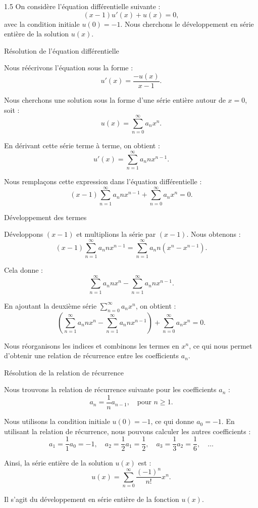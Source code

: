 \documentclass[12pt]{article}
\begin{document}
\begin{spacing}{1.5}
On considère l'équation différentielle suivante :
\[
(x - 1) u'(x) + u(x) = 0,
\]
avec la condition initiale \( u(0) = -1 \). Nous cherchons le développement en série entière de la solution \( u(x) \).

\quad
 Résolution de l'équation différentielle

Nous réécrivons l'équation sous la forme :
\[
u'(x) = \frac{-u(x)}{x - 1}.
\]

Nous cherchons une solution sous la forme d'une série entière autour de \( x = 0 \), soit :
\[
u(x) = \sum_{n=0}^{\infty} a_n x^n.
\]

En dérivant cette série terme à terme, on obtient :
\[
u'(x) = \sum_{n=1}^{\infty} a_n n x^{n-1}.
\]

Nous remplaçons cette expression dans l'équation différentielle :
\[
(x - 1) \sum_{n=1}^{\infty} a_n n x^{n-1} + \sum_{n=0}^{\infty} a_n x^n = 0.
\]

\quad
 Développement des termes

Développons \( (x - 1) \) et multiplions la série par \( (x - 1) \). Nous obtenons :
\[
(x - 1) \sum_{n=1}^{\infty} a_n n x^{n-1} = \sum_{n=1}^{\infty} a_n n (x^{n} - x^{n-1}).
\]

Cela donne :
\[
\sum_{n=1}^{\infty} a_n n x^n - \sum_{n=1}^{\infty} a_n n x^{n-1}.
\]

En ajoutant la deuxième série \( \sum_{n=0}^{\infty} a_n x^n \), on obtient :
\[
\left( \sum_{n=1}^{\infty} a_n n x^n - \sum_{n=1}^{\infty} a_n n x^{n-1} \right) + \sum_{n=0}^{\infty} a_n x^n = 0.
\]

Nous réorganisons les indices et combinons les termes en \( x^n \), ce qui nous permet d'obtenir une relation de récurrence entre les coefficients \( a_n \).

\quad
 Résolution de la relation de récurrence

Nous trouvons la relation de récurrence suivante pour les coefficients \( a_n \) :
\[
a_n = \frac{1}{n} a_{n-1}, \quad \text{pour } n \geq 1.
\]

Nous utilisons la condition initiale \( u(0) = -1 \), ce qui donne \( a_0 = -1 \). En utilisant la relation de récurrence, nous pouvons calculer les autres coefficients :
\[
a_1 = \frac{1}{1} a_0 = -1, \quad a_2 = \frac{1}{2} a_1 = \frac{1}{2}, \quad a_3 = \frac{1}{3} a_2 = \frac{1}{6}, \quad \dots
\]

Ainsi, la série entière de la solution \( u(x) \) est :
\[
u(x) = \sum_{n=0}^{\infty} \frac{(-1)^n}{n!} x^n.
\]

Il s'agit du développement en série entière de la fonction \( u(x) \).


\end{spacing}
\end{document}
